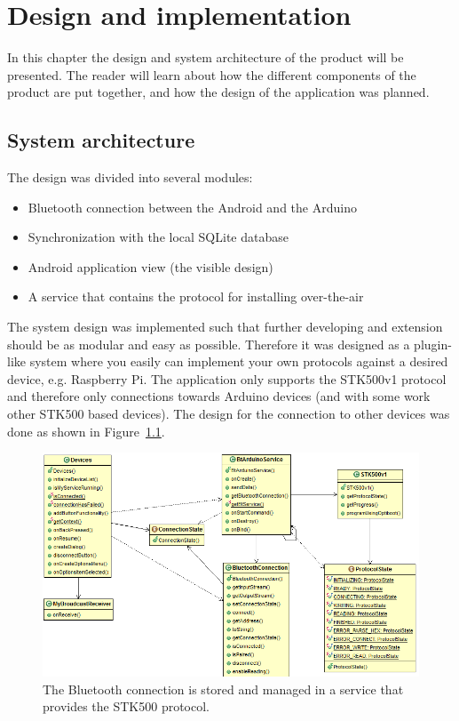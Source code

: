 \chapter{Design and implementation}
In this chapter the design and system architecture of the product will be presented. The reader will learn about how the different components of the product are put together, and how the design of the application was planned.

\section{System architecture}
	The design was divided into several modules:
	\begin{itemize}
		\item{Bluetooth connection between the Android and the Arduino}
		\item{Synchronization with the local SQLite database}
		\item{Android application view (the visible design)}
		\item{A service that contains the protocol for installing over-the-air}
	\end{itemize}
	\vspace{0.2in}
	
	The system design was implemented such that further developing and extension should be as modular and easy as possible.
	Therefore it was designed as a plugin-like system where you easily can implement your own protocols against a desired device, e.g. Raspberry Pi. The application only supports the STK500v1 protocol and therefore only connections towards Arduino devices (and with some work other STK500 based devices). The design for the connection to other devices was done as shown in Figure~\ref{fig:btconnection_service_stk500}.\\

	\begin{figure}[H]
	\centering
	\hspace*{-0.75in}
	\includegraphics[scale=0.85]{images/UML/btconnection_service_stk500.png}
	\caption[BT connection in service]{The Bluetooth connection is stored and managed in a service that provides the STK500 protocol.}
	\label{fig:btconnection_service_stk500}
	\end{figure}

